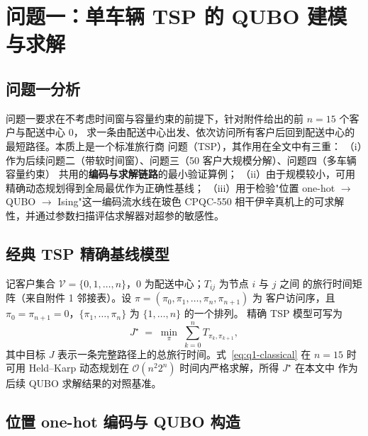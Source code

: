 \documentclass[UTF8,12pt,a4paper]{ctexart}
\begin{document}
\section{问题一：单车辆 TSP 的 QUBO 建模与求解}
\label{sec:q1}

\subsection{问题一分析}

问题一要求在不考虑时间窗与容量约束的前提下，针对附件给出的前 $n=15$ 个客户与配送中心 0，
求一条由配送中心出发、依次访问所有客户后回到配送中心的最短路径。本质上是一个标准旅行商
问题（TSP），其作用在全文中有三重：
（i）作为后续问题二（带软时间窗）、问题三（50 客户大规模分解）、问题四（多车辆容量约束）
共用的\textbf{编码与求解链路}的最小验证算例；
（ii）由于规模较小，可用精确动态规划得到全局最优作为正确性基线；
（iii）用于检验"位置 one-hot $\to$ QUBO $\to$ Ising"这一编码流水线在玻色 CPQC-550
相干伊辛真机上的可求解性，并通过参数扫描评估求解器对超参的敏感性。

\subsection{经典 TSP 精确基线模型}

记客户集合 $\mathcal{V}=\{0,1,\dots,n\}$，0 为配送中心；$T_{ij}$ 为节点 $i$ 与 $j$ 之间
的旅行时间矩阵（来自附件 1 邻接表）。设 $\pi=(\pi_0,\pi_1,\dots,\pi_n,\pi_{n+1})$ 为
客户访问序，且 $\pi_0=\pi_{n+1}=0$，$\{\pi_1,\dots,\pi_n\}$ 为 $\{1,\dots,n\}$ 的一个排列。
精确 TSP 模型可写为
\begin{equation}
\label{eq:q1-classical}
J^{\star} \;=\; \min_{\pi}\; \sum_{k=0}^{n} T_{\pi_k,\pi_{k+1}},
\end{equation}
其中目标 $J$ 表示一条完整路径上的总旅行时间。式~\eqref{eq:q1-classical} 在 $n=15$ 时可用
Held--Karp 动态规划在 $\mathcal{O}(n^2 2^n)$ 时间内严格求解，所得 $J^{\star}$ 在本文中
作为后续 QUBO 求解结果的对照基准。

\subsection{位置 one-hot 编码与 QUBO 构造}
\label{subsec:q1-qubo}
\end{document}
